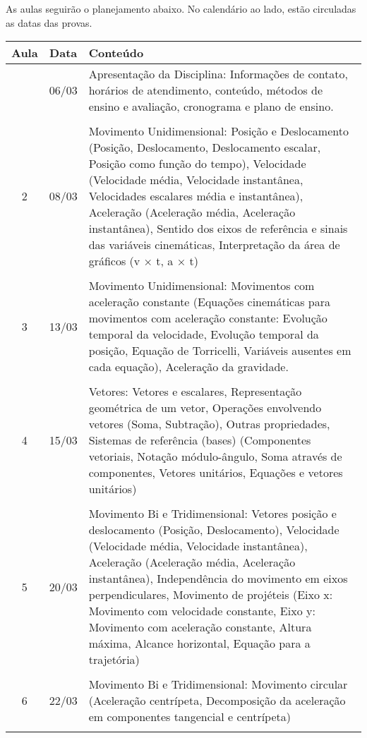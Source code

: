 As aulas seguirão o planejamento abaixo. No calendário ao lado, estão circuladas as datas das provas.
\begin{center}
\begin{longtable}{ccp{70mm}}
\toprule
Aula & Data & Conteúdo \\
\midrule
\endhead
\bottomrule
\endfoot
1 &  06/03 & Apresentação da Disciplina: Informações de contato, horários de atendimento, conteúdo, métodos de ensino e avaliação, cronograma e plano de ensino. \\
\\
2 & 08/03 & Movimento Unidimensional: Posição e Deslocamento (Posição, Deslocamento, Deslocamento escalar, Posição como função do tempo), Velocidade (Velocidade média, Velocidade instantânea, Velocidades escalares média e instantânea), Aceleração (Aceleração média, Aceleração instantânea), Sentido dos eixos de referência e sinais das variáveis cinemáticas, Interpretação da área de gráficos (v × t, a × t) \\
\\
3 & 13/03 & Movimento Unidimensional: Movimentos com aceleração constante (Equações cinemáticas para movimentos com aceleração constante: Evolução temporal da velocidade, Evolução temporal da posição, Equação de Torricelli, Variáveis ausentes em cada equação), Aceleração da gravidade. \\
\\
4 & 15/03 & Vetores: Vetores e escalares, Representação geométrica de um vetor, Operações envolvendo vetores (Soma, Subtração), Outras propriedades, Sistemas de referência (bases) (Componentes vetoriais, Notação módulo-ângulo, Soma através de componentes, Vetores unitários, Equações e vetores unitários) \\
\\
5 & 20/03 & Movimento Bi e Tridimensional: Vetores posição e deslocamento (Posição, Deslocamento), Velocidade (Velocidade média, Velocidade instantânea), Aceleração (Aceleração média, Aceleração instantânea), Independência do movimento em eixos perpendiculares, Movimento de projéteis (Eixo x: Movimento com velocidade constante, Eixo y: Movimento com aceleração constante, Altura máxima, Alcance horizontal, Equação para a trajetória) \\
\\
6 & 22/03 & Movimento Bi e Tridimensional: Movimento circular (Aceleração centrípeta, Decomposição da aceleração em componentes tangencial e centrípeta)\\
\\

\end{longtable}
\end{center}
